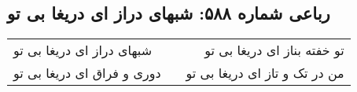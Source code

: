 \begin{center}
\section*{رباعی شماره ۵۸۸: شبهای دراز ای دریغا بی تو}
\label{sec:sh588}
\begin{longtable}{l p{0.5cm} r}
شبهای دراز ای دریغا بی تو
&&
تو خفته بناز ای دریغا بی تو
\\
دوری و فراق ای دریغا بی تو
&&
من در تک و تاز ای دریغا بی تو
\\
\end{longtable}
\end{center}
